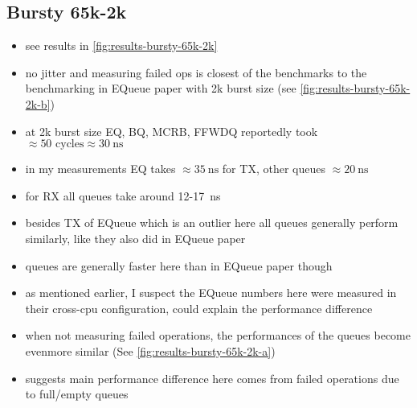 \subsection{Bursty 65k-2k}
\begin{itemize}
    \item see results in \autoref{fig:results-bursty-65k-2k}
    \item no jitter and measuring failed ops is closest of the benchmarks to the benchmarking in EQueue paper
        with 2k burst size (see \autoref{fig:results-bursty-65k-2k-b})
    \item at 2k burst size EQ, BQ, MCRB, FFWDQ reportedly took $\approx 50\text{ cycles} \approx \SI{30}{\nano\second}$
    \item in my measurements EQ takes $\approx \SI{35}{\nano\second}$ for TX, other queues $\approx
        \SI{20}{\nano\second}$
    \item for RX all queues take around 12-\SI{17}{\nano\second}
    \item besides TX of EQueue which is an outlier here all queues generally perform similarly, like they also did
        in EQueue paper
    \item queues are generally faster here than in EQueue paper though
    \item as mentioned earlier, I suspect the EQueue numbers here were measured in their cross-cpu
        configuration, could explain the performance difference
    \item when not measuring failed operations, the performances of the queues become evenmore similar (See
        \autoref{fig:results-bursty-65k-2k-a})
    \item suggests main performance difference here comes from failed operations due to full/empty queues
\end{itemize}

